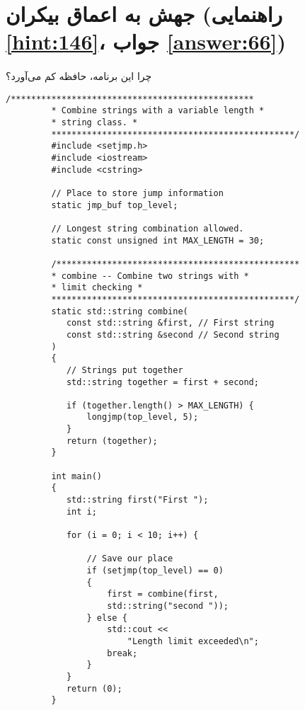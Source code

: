 \section[جهش به اعماق بیکران]{جهش به اعماق بیکران \protect{} (راهنمایی \ref{hint:146}، جواب \ref{answer:66})}
\paragraph{}\label{prog:54}
چرا این برنامه، حافظه کم می‌آورد؟

\begin{LTR}
    \begin{lstlisting}[style=C++Style]
         /************************************************
         * Combine strings with a variable length *
         * string class. *
         ************************************************/
         #include <setjmp.h>
         #include <iostream>
         #include <cstring>

         // Place to store jump information
         static jmp_buf top_level;

         // Longest string combination allowed.
         static const unsigned int MAX_LENGTH = 30;

         /************************************************
         * combine -- Combine two strings with *
         * limit checking *
         ************************************************/
         static std::string combine(
         	const std::string &first, // First string
         	const std::string &second // Second string
         )
         {
         	// Strings put together
         	std::string together = first + second;

         	if (together.length() > MAX_LENGTH) {
         		longjmp(top_level, 5);
         	}
         	return (together);
         }

         int main()
         {
         	std::string first("First ");
         	int i;

         	for (i = 0; i < 10; i++) {

         		// Save our place
         		if (setjmp(top_level) == 0)
         		{
         			first = combine(first,
         			std::string("second "));
         		} else {
         			std::cout <<
         				"Length limit exceeded\n";
         			break;
         		}
         	}
         	return (0);
         }
    \end{lstlisting}
\end{LTR}